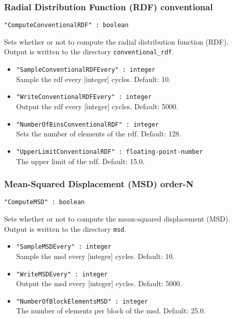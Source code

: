\subsubsection{Radial Distribution Function (RDF) conventional}
\begin{framed}
\verb+"ComputeConventionalRDF" : boolean+
\end{framed}
Sets whether or not to compute the radial distribution function (RDF).\\
Output is written to the directory \verb+conventional_rdf+.
\begin{itemize}
\item{\verb+"SampleConventionalRDFEvery" : integer+}\\
Sample the rdf every [integer] cycles. Default: 10.
\item{\verb+"WriteConventionalRDFEvery" : integer+}\\
Output the rdf every [integer] cycles. Default: 5000.
\item{\verb+"NumberOfBinsConventionalRDF" : integer+}\\
Sets the number of elements of the rdf. Default: 128.
\item{\verb+"UpperLimitConventionalRDF" : floating-point-number+}\\
The upper limit of the rdf. Default: 15.0.
\end{itemize}

\subsubsection{Mean-Squared Displacement (MSD) order-N}
\begin{framed}
\verb+"ComputeMSD" : boolean+
\end{framed}
Sets whether or not to compute the mean-squared displacement (MSD).\\
Output is written to the directory \verb+msd+.
\begin{itemize}
\item{\verb+"SampleMSDEvery" : integer+}\\
Sample the msd every [integer] cycles. Default: 10.
\item{\verb+"WriteMSDEvery" : integer+}\\
Output the msd every [integer] cycles. Default: 5000.
\item{\verb+"NumberOfBlockElementsMSD" : integer+}\\
The number of elements per block of the msd. Default: 25.0.
\end{itemize}

